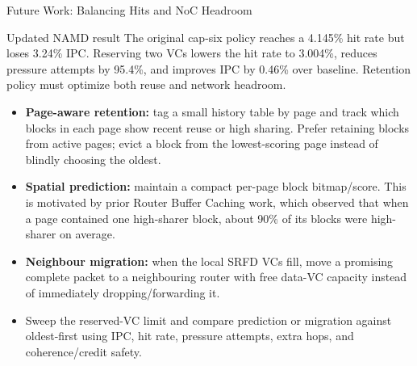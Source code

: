 \documentclass[aspectratio=169,11pt]{beamer}
\begin{document}
\begin{frame}{Future Work: Balancing Hits and NoC Headroom}
  \small
  \begin{alertblock}{Updated NAMD result}
    The original cap-six policy reaches a 4.145\% hit rate but loses 3.24\%
    IPC. Reserving two VCs lowers the hit rate to 3.004\%, reduces pressure
    attempts by 95.4\%, and improves IPC by 0.46\% over baseline. Retention
    policy must optimize both reuse and network headroom.
  \end{alertblock}
  \begin{itemize}
    \item \textbf{Page-aware retention:} tag a small history table by page and track which blocks in each page show recent reuse or high sharing. Prefer retaining blocks from active pages; evict a block from the lowest-scoring page instead of blindly choosing the oldest.
    \item \textbf{Spatial prediction:} maintain a compact per-page block bitmap/score. This is motivated by prior Router Buffer Caching work, which observed that when a page contained one high-sharer block, about 90\% of its blocks were high-sharer on average.
    \item \textbf{Neighbour migration:} when the local SRFD VCs fill, move a promising complete packet to a neighbouring router with free data-VC capacity instead of immediately dropping/forwarding it.
    \item Sweep the reserved-VC limit and compare prediction or migration against oldest-first using IPC, hit rate, pressure attempts, extra hops, and coherence/credit safety.
  \end{itemize}
\end{frame}
\end{document}
